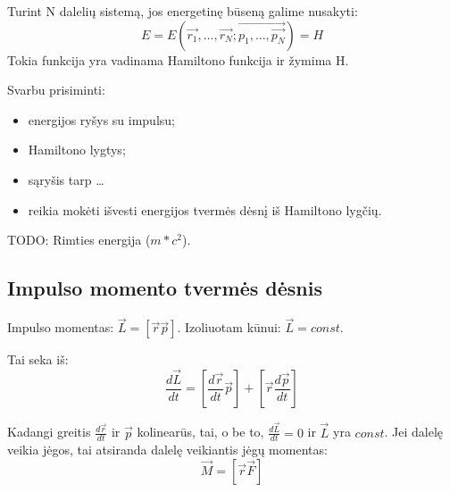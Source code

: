 Turint N dalelių sistemą, jos energetinę būseną galime nusakyti:
\begin{equation*}
  E = E(\vec{r_{1}},\ldots,\vec{r_{N}}; \vec{p_{1},\ldots,\vec{p_{N}}}) = H
\end{equation*}
Tokia funkcija yra vadinama Hamiltono funkcija ir žymima H.

Svarbu prisiminti:
\begin{itemize}
  \item energijos ryšys su impulsu;
  \item Hamiltono lygtys;
  \item sąryšis tarp …
  \item reikia mokėti išvesti energijos tvermės dėsnį iš Hamiltono
    lygčių.
\end{itemize}

TODO: Rimties energija ($m*c^{2}$).

\subsection{Impulso momento tvermės dėsnis}

Impulso momentas: $\vec{L} = \left[ \vec{r}\vec{p} \right]$.
Izoliuotam kūnui: $\vec{L} = const.$

Tai seka iš:
\begin{equation*}
  \frac{d\vec{L}}{dt} = \left[ \frac{d\vec{r}}{dt} \vec{p} \right] +
  \left[ \vec{r} \frac{d\vec{p}}{dt} \right]
\end{equation*}

Kadangi greitis $\frac{d\vec{r}}{dt}$ ir $\vec{p}$ kolinearūs, tai,
o be to, $\frac{d\vec{L}}{dt} = 0$ ir $\vec{L}$ yra $const$.
Jei dalelę veikia jėgos, tai atsiranda dalelę veikiantis jėgų
momentas:
\begin{equation*}
  \vec{M} = \left[ \vec{r}\vec{F} \right]
\end{equation*}
